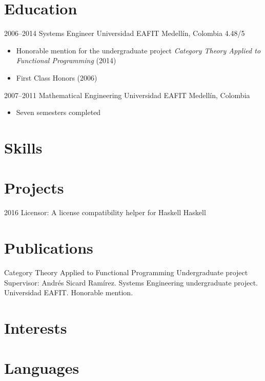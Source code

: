 \documentclass[12pt,letterpaper,sans]{moderncv}
\begin{document}
\section{Education}

\cventry
  {2006--2014}
  {Systems Engineer}
  {Universidad EAFIT}
  {Medellín, Colombia}
  {4.48/5}
  {
    \begin{itemize}
    \item
      Honorable mention for the undergraduate project \emph{Category
        Theory Applied to Functional Programming} (2014)
    \item
      First Class Honors (2006)
    \end{itemize}
  }
\cventry
  {2007--2011}
  {Mathematical Engineering}
  {Universidad EAFIT}
  {Medellín, Colombia}
  {}
  {
    \begin{itemize}
    \item
      Seven semesters completed
    \end{itemize}
  }

\section{Skills}


\section{Projects}

\cventry
  {2016}
  {}
  {Licensor: A license compatibility helper for Haskell}
  {Haskell}
  {}
  {}

\section{Publications}

  {Category Theory Applied to Functional Programming}
  {Undergraduate project}
  {}
  {}
  {
    Supervisor: Andrés Sicard Ramírez. Systems Engineering
    undergraduate project. Universidad EAFIT. Honorable mention.
  }

\section{Interests}


\section{Languages}

\end{document}

